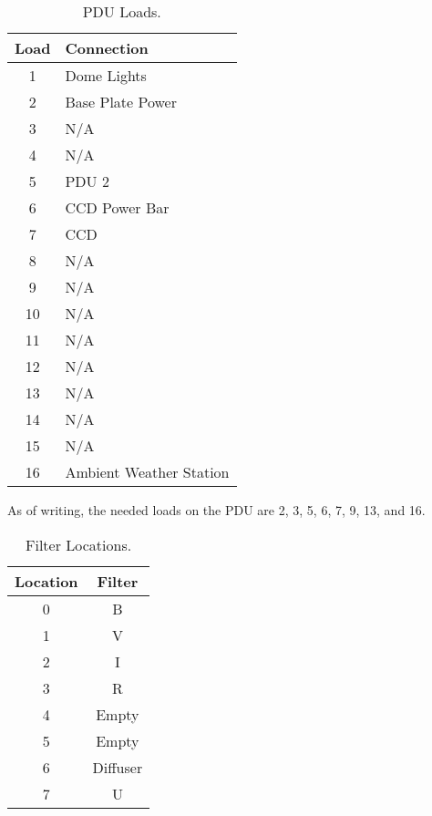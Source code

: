 \documentclass[letterpaper,12pt]{article}
\begin{document}
\begin{table}[H]
	\caption{\label{tab:load}PDU Loads.}
	\begin{center}
			\begin{tabular}{c|l}
				Load	& Connection\\\hline
				1 		& Dome Lights\\
				2 		& Base Plate Power\\
				3 		& N/A\\
				4 		& N/A\\
				5 		& PDU 2\\
				6 		& CCD Power Bar\\
				7 		& CCD\\
				8 		& N/A\\
				9 		& N/A\\
				10 		& N/A\\
				11 		& N/A\\
				12 		& N/A\\
				13 		& N/A\\
				14 		& N/A\\
				15 		& N/A\\
				16 		& Ambient Weather Station\\
			\end{tabular}
	\end{center}
\end{table}

As of writing, the needed loads on the PDU are 2, 3, 5, 6, 7, 9, 13, and 16.

\begin{table}[H]
	\caption{\label{tab:filt}Filter Locations.}
	\begin{center}
			\begin{tabular}{c|c}
				Location	& Filter\\\hline
				0		& B\\
				1 		& V\\
				2 		& I\\
				3 		& R\\
				4 		& Empty\\
				5 		& Empty\\
				6 		& Diffuser\\
				7 		& U\\
			\end{tabular}
	\end{center}
\end{table}
\newpage
\end{document}
